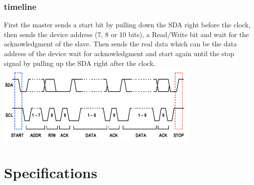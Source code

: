 \documentclass[12pt,a4paper,landscape]{article}
\begin{document}
\begin{multicols}{2}
		\subsubsection*{timeline}
		First the master sends a start bit by pulling down the SDA right before the clock, then sends the device address (7, 8 or 10 bits), a Read/Write bit and wait for the acknowledgment of the slave. Then sends the real data which can be the data address of the device wait for acknowledgment and start again until the stop signal by pulling up the SDA right after the clock. 
		\includegraphics[width=10cm]{i2c.png}

	\end{multicols}
\section*{Specifications}


\vspace{2cm}

\newpage
{}
\end{document}
